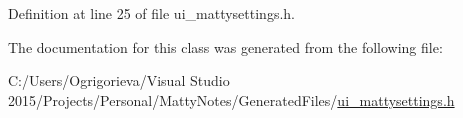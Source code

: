 Definition at line 25 of file ui\+\_\+mattysettings.\+h.



The documentation for this class was generated from the following file\+:\begin{DoxyCompactItemize}
\item 
C\+:/\+Users/\+Ogrigorieva/\+Visual Studio 2015/\+Projects/\+Personal/\+Matty\+Notes/\+Generated\+Files/\hyperlink{ui__mattysettings_8h}{ui\+\_\+mattysettings.\+h}\end{DoxyCompactItemize}
